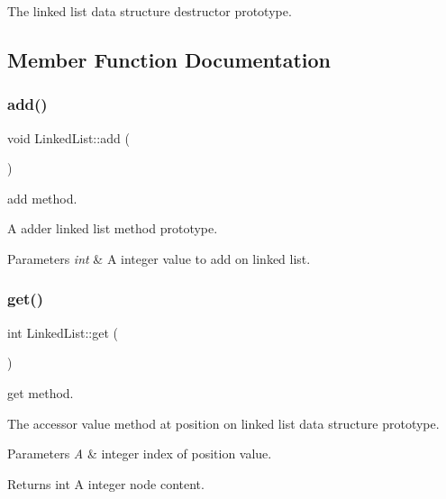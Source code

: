 The linked list data structure destructor prototype. 

\subsection{Member Function Documentation}
\mbox{\label{classLinkedList_afe1904ffe05ef5a9c80be00fd920ab81}} 
\subsubsection{\texorpdfstring{add()}{add()}}
{\footnotesize\ttfamily void Linked\+List\+::add (\begin{DoxyParamCaption}\item[{int}]{ }\end{DoxyParamCaption})}



add method. 

A adder linked list method prototype.


\begin{DoxyParams}{Parameters}
{\em int} & A integer value to add on linked list. \\
\hline
\end{DoxyParams}
\mbox{\label{classLinkedList_aeed8f219fd2a19fe22627eba351cb87d}} 
\subsubsection{\texorpdfstring{get()}{get()}}
{\footnotesize\ttfamily int Linked\+List\+::get (\begin{DoxyParamCaption}\item[{int}]{ }\end{DoxyParamCaption})}



get method. 

The accessor value method at position on linked list data structure prototype.


\begin{DoxyParams}{Parameters}
{\em A} & integer index of position value. \\
\hline
\end{DoxyParams}
\begin{DoxyReturn}{Returns}
int A integer node content. 
\end{DoxyReturn}
\mbox{\label{classLinkedList_aeb436e928e809afd59ec063426015d41}} 
